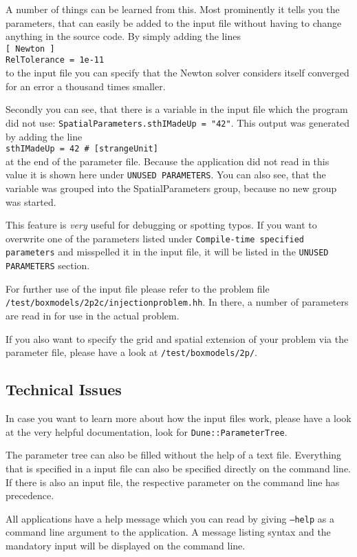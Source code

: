 A number of things can be learned from this. Most prominently it tells you the parameters, that can easily be added to the input file without having to change anything in the source code. 
By simply adding the lines\\
\texttt{[ Newton ]\\
RelTolerance = 1e-11}\\
to the input file you can specify that the Newton solver considers itself converged for an error a thousand times smaller. 

Secondly you can see, that there is a variable in the input  file which the program did not use:
\newline
\texttt{SpatialParameters.sthIMadeUp = "42"}.
\newline 
This output was generated by adding the line \\
\lstinline{sthIMadeUp = 42 # [strangeUnit]}\\
at the end of the parameter file. Because the application did not read in this value it is shown here under \texttt{UNUSED PARAMETERS}. You can also see, that the variable was grouped into the SpatialParameters group, because no new group was started. 

This feature is \emph{very} useful for debugging or spotting typos. If you want to overwrite one of the parameters listed under \texttt{Compile-time specified parameters} and misspelled it in the input file, it will be listed in the  \texttt{UNUSED PARAMETERS} section. 

For further use of the input file please refer to the problem file 
\newline 
\texttt{/test/boxmodels/2p2c/injectionproblem.hh}.
\newline
In there, a number of parameters are read in for use in the actual problem. 

If you also want to specify  the grid and spatial extension of your problem via the parameter file, please have a look at 
  \newline 
\texttt{/test/boxmodels/2p/}.
  
\subsection{Technical Issues}
In case you want to learn more about how the input files work, please have a look at the very helpful \Dune documentation, look for \texttt{Dune::ParameterTree}.
  
The parameter tree can also be filled without the help of a text file. Everything that is specified in a \Dumux input file can also be specified directly on the command line. If there is also an input file, the respective parameter on the command line has precedence. 

All applications have a help message which you can read by giving \texttt{--help}   as a command line argument to the application. A message listing syntax and the mandatory input will be displayed on the command line. 
  
  
